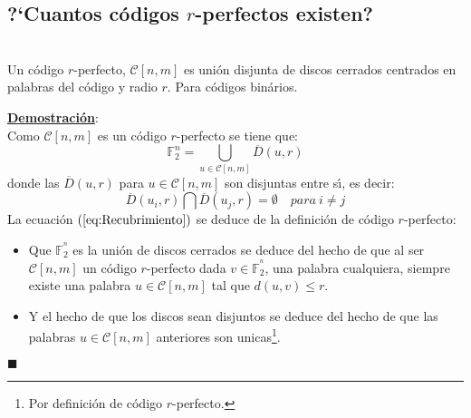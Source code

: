 %
%

\subsection{?`Cuantos c\'odigos $r$-perfectos existen?}

\begin{lema}\label{lem:Disjuntos}
\ \\
Un c\'odigo $r$-perfecto, $\mathcal{C}[n,m]$ es uni\'on disjunta de discos
cerrados centrados en palabras del c\'odigo y radio $r$. Para c\'odigos
bin\'arios.
\end{lema}
\underline{\textbf{Demostraci\'on}}:\\
Como $\mathcal{C}[n,m]$ es un c\'odigo $r$-perfecto se tiene que:
\begin{equation}\label{eq:Recubrimiento}
\mathbb{F}^{n}_2 = \bigcup_{u\in \mathcal{C}[n,m]} \overline{D}(u,r)
\end{equation}
donde las $\overline{D}(u,r)$ para $u\in \mathcal{C}[n,m]$ son disjuntas entre
s\'{\i}, es decir:
\begin{displaymath}
\overline{D}(u_i,r)\bigcap \overline{D}(u_j,r) = \emptyset\quad para\ i\neq j
\end{displaymath}
La ecuaci\'on $(\ref{eq:Recubrimiento})$ se deduce de la definici\'on de 
c\'odigo $r$-perfecto:
\begin{itemize}
\item Que $\mathbb{F}^{^n}_2$ es la uni\'on de discos cerrados se deduce del
hecho de que al ser $\mathcal{C}[n,m]$ un c\'odigo $r$-perfecto dada
$v\in\mathbb{F}^{^n}_2$, una palabra cualquiera, siempre existe una palabra
$u\in\mathcal{C}[n,m]$ tal que $d(u,v)\leq r$.
\item Y el hecho de que los discos sean disjuntos se deduce del hecho de que
las palabras $u\in \mathcal{C}[n,m]$ anteriores son unicas\footnote{Por
definici\'on de c\'odigo $r$-perfecto.}.
\end{itemize}
\begin{flushright}
$\blacksquare$
\end{flushright}

